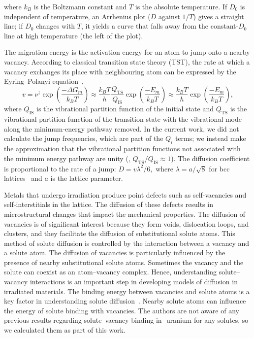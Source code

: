 where $k_B$ is the Boltzmann constant and $T$ is the absolute temperature.
If $D_0$ is independent of temperature, an Arrhenius plot ($D$ against $1/T$)
gives a straight line; if $D_0$ changes with $T$, it yields a curve that falls
away from the constant-$D_0$ line at high temperature (the left of the plot).

The migration energy is the activation energy for an atom to jump onto a
nearby vacancy. According to classical transition state theory (TST), the rate
at which a vacancy exchanges its place with neighbouring atom can be expressed
by the Eyring--Polanyi
equation~\cite{Eyring1935,Evans1935,vineyard1957frequency},
\begin{equation}
    v = \nu^\ddagger \exp\left(\frac{-\Delta G_m}{k_B T}\right)
      \approx \frac{k_B T}{h} \frac{Q_\text{TS}}{Q_\text{IS}}
              \exp\left(\frac{-E_m}{k_B T}\right)
      \approx \frac{k_B T}{h}
              \exp\left(\frac{-E_m}{k_B T}\right),
\end{equation}
where $Q_\text{IS}$ is the vibrational partition function of the initial
state and $Q_\text{TS}$ is the vibrational partition function of the transition
state with the vibrational mode along the minimum-energy pathway removed.
In the current work, we did not calculate the jump frequencies, which are
part of the $Q_i$ terms; we instead make the approximation that the vibrational
partition functions not associated with the minimum energy pathway are unity
(\ie, $Q_\text{TS}/Q_\text{IS} \approx 1$).
The diffusion coefficient is proportional to the rate of a jump:
$D = v\lambda^2/6,$ where $\lambda = a/\sqrt{8}$ for bcc
lattices~\cite{Heinola2010a} and $a$ is the lattice parameter.


Metals that undergo irradiation produce point defects such as self-vacancies and self-interstitials in the lattice. The diffusion of these defects results in microstructural changes that impact the mechanical properties. The diffusion of vacancies is of significant interest because they form voids, dislocation loops, and clusters, and they facilitate the diffusion of substitutional solute atoms. This method of solute diffusion is controlled by the interaction between a vacancy and a solute atom. The diffusion of vacancies is particularly influenced by the presence of nearby substitutional solute atoms. Sometimes the vacancy and the solute can coexist as an atom--vacancy complex. Hence, understanding solute--vacancy interactions is an important step in developing models of diffusion in irradiated materials.
The binding energy between vacancies and solute atoms is a key factor in understanding solute 
diffusion~\cite{balluffi1973diffusion, wolverton2007solute}. Nearby solute atoms
can influence the energy of solute binding with vacancies. The authors are not aware of any previous results regarding solute--vacancy
binding in \textgamma-uranium for any solutes, so we calculated them as part of
this work.

